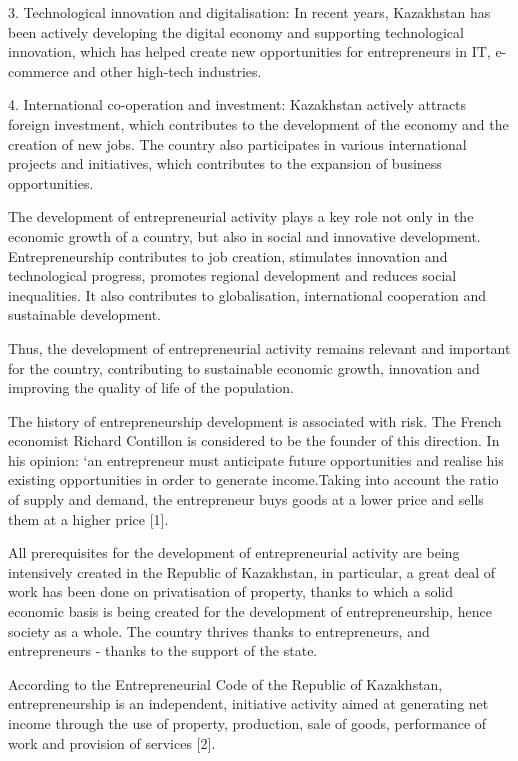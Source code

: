 \begin{multicols}{2}
3. Technological innovation and digitalisation: In recent years,
Kazakhstan has been actively developing the digital economy and
supporting technological innovation, which has helped create new
opportunities for entrepreneurs in IT, e-commerce and other high-tech
industries.

4. International co-operation and investment: Kazakhstan actively
attracts foreign investment, which contributes to the development of
the economy and the creation of new jobs. The country also
participates in various international projects and initiatives, which
contributes to the expansion of business opportunities.

The development of entrepreneurial activity plays a key role not only in
the economic growth of a country, but also in social and innovative
development. Entrepreneurship contributes to job creation, stimulates
innovation and technological progress, promotes regional development and
reduces social inequalities. It also contributes to globalisation,
international cooperation and sustainable development.

Thus, the development of entrepreneurial activity remains relevant and
important for the country, contributing to sustainable economic growth,
innovation and improving the quality of life of the population.

The history of entrepreneurship development is associated with risk. The
French economist Richard Contillon is considered to be the founder of
this direction. In his opinion: `an entrepreneur must anticipate future
opportunities and realise his existing opportunities in order to
generate income.Taking into account the ratio of supply and demand, the
entrepreneur buys goods at a lower price and sells them at a higher
price {[}1{]}.

All prerequisites for the development of entrepreneurial activity are
being intensively created in the Republic of Kazakhstan, in particular,
a great deal of work has been done on privatisation of property, thanks
to which a solid economic basis is being created for the development of
entrepreneurship, hence society as a whole. The country thrives thanks
to entrepreneurs, and entrepreneurs - thanks to the support of the
state.

According to the Entrepreneurial Code of the Republic of Kazakhstan,
entrepreneurship is an independent, initiative activity aimed at
generating net income through the use of property, production, sale of
goods, performance of work and provision of services {[}2{]}.


\end{multicols}
